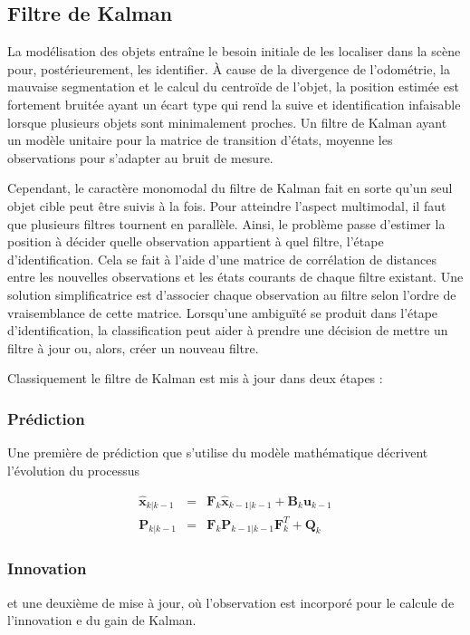 \subsection{Filtre de Kalman }

La modélisation des objets entraîne le besoin initiale de les
localiser dans la scène pour, postérieurement, les identifier. À cause
de la divergence de l'odométrie, la mauvaise segmentation et le calcul
du centroïde de l'objet, la position estimée est fortement bruitée
ayant un écart type qui rend la suive et identification infaisable
lorsque plusieurs objets sont minimalement proches. Un filtre de
Kalman ayant un modèle unitaire pour la matrice de transition d'états,
moyenne les observations pour s'adapter au bruit de mesure.

Cependant, le caractère monomodal du filtre de Kalman fait en sorte
qu'un seul objet cible peut être suivis à la fois. Pour atteindre
l'aspect multimodal, il faut que plusieurs filtres tournent en
parallèle. Ainsi, le problème passe d’estimer la position à décider
quelle observation appartient à quel filtre, l'étape
d'identification. Cela se fait à l'aide d'une matrice de corrélation
de distances entre les nouvelles observations et les états courants de
chaque filtre existant. Une solution simplificatrice est d'associer
chaque observation au filtre selon l'ordre de vraisemblance de cette
matrice. Lorsqu’une ambiguïté se produit dans l'étape
d'identification, la classification peut aider à prendre une décision
de mettre un filtre à jour ou, alors, créer un nouveau filtre.

Classiquement le filtre de Kalman est mis à jour dans deux étapes : 

\subsubsection{Prédiction} Une première de prédiction que s'utilise du modèle mathématique décrivent l'évolution du processus 

\begin{equation*}
	\begin{array}{ccl}
		\hat{\textbf{x}}_{k|k-1} &=& \textbf{F}_{k}\hat{\textbf{x}}_{k-1|k-1} + \textbf{B}_{k} \textbf{u}_{k-1}\\
		\textbf{P}_{k|k-1} &=& \textbf{F}_{k} \textbf{P}_{k-1|k-1} \textbf{F}_{k}^{T} + \textbf{Q}_{k}
	\end{array}
\end{equation*}

\subsubsection{Innovation}
et une deuxième de mise à jour, où l'observation est incorporé pour le calcule de l'innovation e du gain de Kalman.

